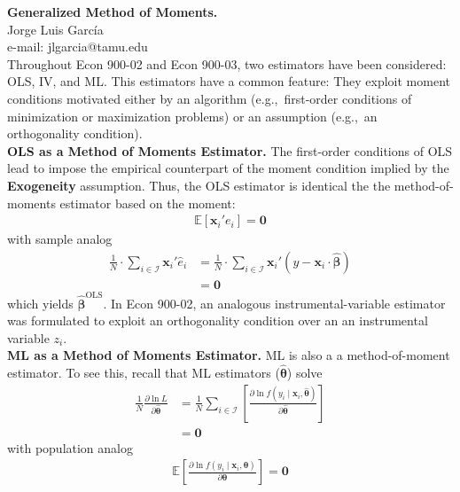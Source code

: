 
\let\counterwithout\relax
\let\counterwithin\relax
{}



\noindent \textbf{Generalized Method of Moments.}\\
\noindent Jorge Luis García \\
\noindent e-mail: jlgarcia@tamu.edu\\

\noindent Throughout Econ 900-02 and Econ 900-03, two estimators have been considered: OLS, IV, and ML. This estimators have a common feature: They exploit moment conditions motivated either by an algorithm (e.g.,\ first-order conditions of minimization or maximization problems) or an assumption (e.g.,\ an orthogonality condition).\\

\noindent \textbf{OLS as a Method of Moments Estimator.} The first-order conditions of OLS lead to impose the empirical counterpart of the moment condition implied by the \textbf{Exogeneity} assumption. Thus, the OLS estimator is identical the the method-of-moments estimator based on the moment: 
\begin{align}
	\mathbb{E} \left[ \bm{x}_i' e_i \right] = \bm{0} 
\end{align}
\noindent with sample analog 
\begin{align}
	\frac{1}{N} \cdot \sum \limits _{i \in \mathcal{I}} \bm{x}_i' \hat{e}_i & =  \frac{1}{N} \cdot \sum \limits _{i \in \mathcal{I}} \bm{x}_i' \left( y - \bm{x}_i \cdot \bm{\hat{\beta}} \right)  
	\nonumber \\ 
	& = \bm{0}
\end{align}
\noindent which yields $\bm{\hat{\beta}}^{\text{OLS}}$. In Econ 900-02, an analogous instrumental-variable estimator was formulated to exploit an orthogonality condition over an an instrumental variable $z_{i}$.\\

\noindent \textbf{ML as a Method of Moments Estimator.} ML is also a a method-of-moment estimator. To see this, recall that ML estimators ($\bm{\hat{\theta}}$) solve 
\begin{align}
	\frac{1}{N} \frac{ \partial \ln L} { \partial \bm{\hat{\theta}} } & = \frac{1}{N}   \sum \limits _{i \in \mathcal{I}} \left[ \frac{ \partial \ln f \left( y_i \mid \bm{x}_i, \bm{\hat{\theta}} \right) } { \partial \bm{\hat{\theta}} } \right] \nonumber \\ 
		& = \bm{0}
\end{align}
\noindent with population analog 
\begin{align}
	\mathbb{E} \left[ \frac{ \partial \ln f \left( y_i \mid \bm{x}_i, \bm{\theta} \right) } { \partial \bm{\theta} } \right] = \bm{0}
\end{align}

